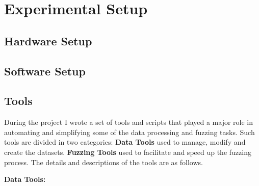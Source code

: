 \documentclass[../main.tex]{subfiles}
\begin{document}
\chapter{Experimental Setup}
\label{chap:experimsetup}
\section{Hardware Setup}

\section{Software Setup}

\section{Tools}
\label{sec:tools}

During the project I wrote a set of tools and scripts that played a major role
in automating and simplifying some of the data processing and fuzzing tasks.
Such tools are divided in two categories: \textbf{Data Tools} used to manage,
modify and create the datasets. \textbf{Fuzzing Tools} used to facilitate and
speed up the fuzzing process. The details and descriptions of the tools are as
follows.
\bigskip

\textbf{Data Tools:}
\end{document}
